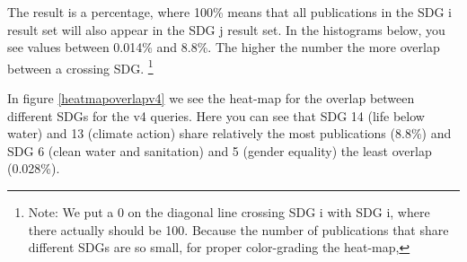 \documentclass{article}
\begin{document}
The result is a percentage, where 100\% means that all publications in the SDG i result set will also appear in the SDG j result set. In the histograms below, you see values between 0.014\% and 8.8\%. The higher the number the more overlap between a crossing SDG. \footnote{
Note: We put a 0 on the diagonal line crossing SDG i with SDG i, where there actually should be 100. Because the number of publications that share different SDGs are so small, for proper color-grading the heat-map, }

In figure \ref{heatmapoverlapv4} we see the heat-map for the overlap between different SDGs for the v4 queries. Here you can see that SDG 14 (life below water) and 13 (climate action) share relatively the most publications (8.8\%) and SDG 6 (clean water and sanitation) and 5 (gender equality) the least overlap (0.028\%).
\end{document}

